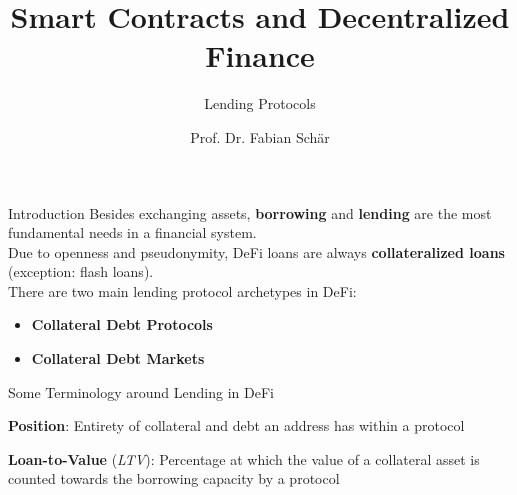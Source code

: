 \documentclass[handout]{beamer}
\title{Smart Contracts and Decentralized Finance}
\subtitle{Lending Protocols}
\author{Prof. Dr. Fabian Schär}
\institute{University of Basel}
\begin{document}
\thispagestyle{empty}
\begin{frame}[noframenumbering]
	\titlepage
\end{frame}

\begin{frame}{Introduction}
Besides exchanging assets, \textbf{borrowing} and \textbf{lending} are the most fundamental needs in a financial system. \\

\vspace{1em}
Due to openness and pseudonymity, DeFi loans are always \textbf{collateralized loans} (exception: flash loans).\\

\vspace{1em}
There are two main lending protocol archetypes in DeFi: 
\vspace{1em}
\begin{itemize}
  \item \textbf{Collateral Debt Protocols}
  \item \textbf{Collateral Debt Markets}
\end{itemize}
	
\end{frame}


\begin{frame}{Some Terminology around Lending in DeFi}

\vspace{1em}

		
			 {\textbf{Position}: Entirety of collateral and debt an address has within a protocol}
			
\vspace{1em}

			
			  {\textbf{Loan-to-Value} (\textit{LTV}): Percentage at which the value of a collateral asset is counted towards the borrowing capacity by a protocol}
			



\end{frame}
\end{document}
